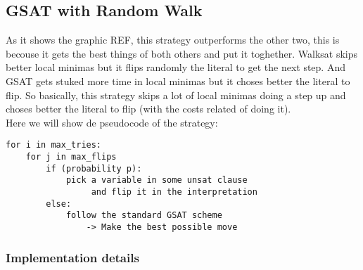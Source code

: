 
\subsection{GSAT with Random Walk}
As it shows the graphic REF, this strategy outperforms the other two, this is becouse it gets the best things of both others and put it toghether. Walksat skips better local minimas but it flips randomly the literal to get the next step. And GSAT gets stuked more time in local minimas but it choses better the literal to flip. So basically, this strategy skips a lot of local minimas doing a step up and choses better the literal to flip (with the costs related of doing it).\\
Here we will show de pseudocode of the strategy:
\begin{lstlisting}
for i in max_tries:
	for j in max_flips
		if (probability p):
			pick a variable in some unsat clause
				 and flip it in the interpretation
		else:
			follow the standard GSAT scheme 
				-> Make the best possible move
\end{lstlisting}
\subsubsection{Implementation details}


